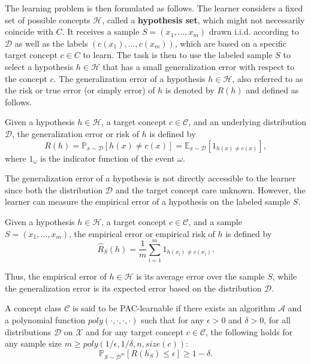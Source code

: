 The learning problem is then formulated as follows.
The learner considers a fixed set of possible concepts
$\mathcal{H}$, called a \textbf{hypothesis set}, which might not necessarily coincide with $C$.
It receives a sample $S = (x_1,...,x_m)$ drawn i.i.d. according to $\mathcal{D}$ as well as the labels
$(c(x_1),...,c(x_m))$, which are based on a specific target concept $c \in C$ to learn. The
task is then to use the labeled sample $S$ to select a hypothesis $h \in \mathcal{H}$ that has a
small generalization error with respect to the concept $c$. The generalization error
of a hypothesis $h \in \mathcal{H}$, also referred to as the risk or true error (or simply error)
of $h$ is denoted by $R(h)$ and defined as follows.


\begin{definition}
	Given a hypothesis $h \in \mathcal{H}$, a target concept $c \in \mathcal{C}$, and an underlying distribution $\mathcal{D}$, the generalization error or risk of $h$ is defined by
	\begin{equation}
		R(h) = \mathbb{P}_{x\sim\mathcal{D}}[h(x) \neq c(x)] = \mathbb{E}_{x\sim\mathcal{D}}[1_{h(x)\neq c(x)}],
	\end{equation}
	where $1_\omega$ is the indicator function of the event $\omega$.
\end{definition}

The generalization error of a hypothesis is not directly accessible to the learner
since both the distribution $\mathcal{D}$ and the target concept care unknown. However, the
learner can measure the empirical error of a hypothesis on the labeled sample $S$.

\begin{definition}
	Given a hypothesis $h \in \mathcal{H}$, a target concept $c \in \mathcal{C}$, and a sample $S = (x_1,\ldots,x_m)$, the empirical error or empirical risk of $h$ is defined by
	\begin{equation}
		\hat{R}_S(h) = \frac{1}{m}\sum_{i=1}^m 1_{h(x_i)\neq c(x_i)}.
	\end{equation}
\end{definition}
Thus, the empirical error of $h \in \mathcal{H}$ is its average error over the sample $S$, while the
generalization error is its expected error based on the distribution $\mathcal{D}$.

\begin{definition}
	A concept class $\mathcal{C}$ is said to be PAC-learnable if there exists an algorithm $\mathcal{A}$ and a polynomial function $poly(\cdot,\cdot,\cdot,\cdot)$ such that for any $\epsilon > 0$ and $\delta > 0$, for all distributions $\mathcal{D}$ on $\mathcal{X}$ and for any target concept $c \in \mathcal{C}$, the following holds for any sample size $m \geq poly(1/\epsilon, 1/\delta, n, size(c))$:
	\begin{equation}
		\mathbb{P}_{S\sim\mathcal{D}^m}[R(h_S) \leq \epsilon] \geq 1-\delta.
	\end{equation}
\end{definition}